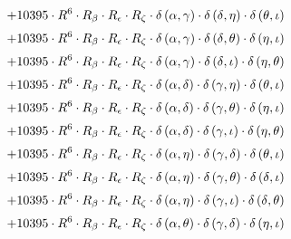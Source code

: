 \begin{subequations}
\begin{gather}
 \\[0.2em] \notag 		 + 10395 \cdot R^{6} \cdot R_{\beta{}} \cdot R_{\epsilon{}} \cdot R_{\zeta{}} \cdot \delta{}\left(\alpha{}, \gamma{}\right) \cdot \delta{}\left(\delta{}, \eta{}\right) \cdot \delta{}\left(\theta{}, \iota{}\right) 
 \\[0.2em] \notag 		 + 10395 \cdot R^{6} \cdot R_{\beta{}} \cdot R_{\epsilon{}} \cdot R_{\zeta{}} \cdot \delta{}\left(\alpha{}, \gamma{}\right) \cdot \delta{}\left(\delta{}, \theta{}\right) \cdot \delta{}\left(\eta{}, \iota{}\right) 
 \\[0.2em] \notag 		 + 10395 \cdot R^{6} \cdot R_{\beta{}} \cdot R_{\epsilon{}} \cdot R_{\zeta{}} \cdot \delta{}\left(\alpha{}, \gamma{}\right) \cdot \delta{}\left(\delta{}, \iota{}\right) \cdot \delta{}\left(\eta{}, \theta{}\right) 
 \\[0.2em] \notag 		 + 10395 \cdot R^{6} \cdot R_{\beta{}} \cdot R_{\epsilon{}} \cdot R_{\zeta{}} \cdot \delta{}\left(\alpha{}, \delta{}\right) \cdot \delta{}\left(\gamma{}, \eta{}\right) \cdot \delta{}\left(\theta{}, \iota{}\right) 
 \\[0.2em] \notag 		 + 10395 \cdot R^{6} \cdot R_{\beta{}} \cdot R_{\epsilon{}} \cdot R_{\zeta{}} \cdot \delta{}\left(\alpha{}, \delta{}\right) \cdot \delta{}\left(\gamma{}, \theta{}\right) \cdot \delta{}\left(\eta{}, \iota{}\right) 
 \\[0.2em] \notag 		 + 10395 \cdot R^{6} \cdot R_{\beta{}} \cdot R_{\epsilon{}} \cdot R_{\zeta{}} \cdot \delta{}\left(\alpha{}, \delta{}\right) \cdot \delta{}\left(\gamma{}, \iota{}\right) \cdot \delta{}\left(\eta{}, \theta{}\right) 
 \\[0.2em] \notag 		 + 10395 \cdot R^{6} \cdot R_{\beta{}} \cdot R_{\epsilon{}} \cdot R_{\zeta{}} \cdot \delta{}\left(\alpha{}, \eta{}\right) \cdot \delta{}\left(\gamma{}, \delta{}\right) \cdot \delta{}\left(\theta{}, \iota{}\right) 
 \\[0.2em] \notag 		 + 10395 \cdot R^{6} \cdot R_{\beta{}} \cdot R_{\epsilon{}} \cdot R_{\zeta{}} \cdot \delta{}\left(\alpha{}, \eta{}\right) \cdot \delta{}\left(\gamma{}, \theta{}\right) \cdot \delta{}\left(\delta{}, \iota{}\right) 
 \\[0.2em] \notag 		 + 10395 \cdot R^{6} \cdot R_{\beta{}} \cdot R_{\epsilon{}} \cdot R_{\zeta{}} \cdot \delta{}\left(\alpha{}, \eta{}\right) \cdot \delta{}\left(\gamma{}, \iota{}\right) \cdot \delta{}\left(\delta{}, \theta{}\right) 
 \\[0.2em] \notag 		 + 10395 \cdot R^{6} \cdot R_{\beta{}} \cdot R_{\epsilon{}} \cdot R_{\zeta{}} \cdot \delta{}\left(\alpha{}, \theta{}\right) \cdot \delta{}\left(\gamma{}, \delta{}\right) \cdot \delta{}\left(\eta{}, \iota{}\right) 

\end{gather}
\end{subequations}
